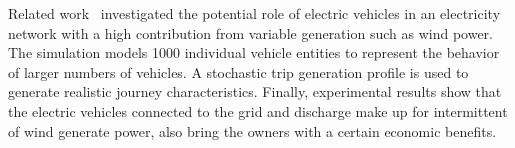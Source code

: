 Related work~\cite{YC_DRUITT2012104} investigated the potential role of electric vehicles in an electricity network with a high contribution from variable generation such as wind power. The simulation models 1000 individual vehicle entities to represent the behavior of larger numbers of vehicles. 
A stochastic trip generation profile is used to generate realistic journey characteristics. 
Finally, experimental results show that the electric vehicles connected to the grid and discharge make up for intermittent of wind generate power, also bring the owners with a certain economic benefits.



